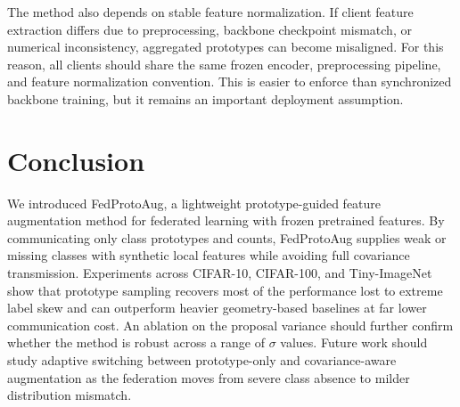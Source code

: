 ﻿\documentclass[runningheads]{llncs}
\newcommand{\method}{FedProtoAug}
\begin{document}
The method also depends on stable feature normalization. If client feature extraction differs due to preprocessing, backbone checkpoint mismatch, or numerical inconsistency, aggregated prototypes can become misaligned. For this reason, all clients should share the same frozen encoder, preprocessing pipeline, and feature normalization convention. This is easier to enforce than synchronized backbone training, but it remains an important deployment assumption.

\section{Conclusion}
We introduced \method, a lightweight prototype-guided feature augmentation method for federated learning with frozen pretrained features. By communicating only class prototypes and counts, \method{} supplies weak or missing classes with synthetic local features while avoiding full covariance transmission. Experiments across CIFAR-10, CIFAR-100, and Tiny-ImageNet show that prototype sampling recovers most of the performance lost to extreme label skew and can outperform heavier geometry-based baselines at far lower communication cost. An ablation on the proposal variance should further confirm whether the method is robust across a range of $\sigma$ values. Future work should study adaptive switching between prototype-only and covariance-aware augmentation as the federation moves from severe class absence to milder distribution mismatch.



\end{document}
